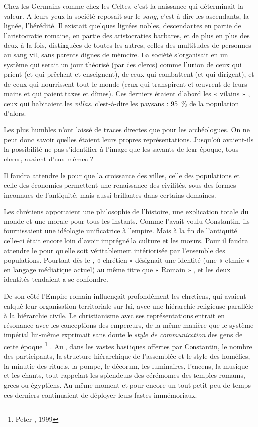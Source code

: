  Chez les Germains comme chez les Celtes, c'est la naissance qui déterminait la valeur. A leurs yeux la société reposait sur le \emph{sang}, c'est-à-dire les ascendants, la lignée, l'hérédité. Il existait quelques lignées nobles, descendantes en partie de l'aristocratie romaine, en partie des aristocraties barbares, et de plus en plus des deux à la fois, distinguées de toutes les autres, celles des multitudes de personnes au sang vil, sans parents dignes de mémoire. La société s'organisait en un système qui serait un jour théorisé (par des clercs) comme l'union de ceux qui prient (et qui prêchent et enseignent), de ceux qui combattent (et qui dirigent), et de ceux qui nourrissent tout le monde (ceux qui transpirent et œuvrent de leurs mains et qui paient taxes et dîmes). Ces derniers étaient d'abord les « vilains » , ceux qui habitaient les \emph{villas}, c'est-à-dire les paysans : 95~\% de la population d'alors.

 Les plus humbles n'ont laissé de traces directes que pour les archéologues. On ne peut donc savoir quelles étaient leurs propres représentations. Jusqu'où avaient-ils la possibilité ne pas s'identifier à l'image que les savants de leur époque, tous clercs, avaient d'eux-mêmes ?

 Il faudra attendre le  pour que la croissance des villes, celle des populations et celle des économies permettent une renaissance des civilités, sous des formes inconnues de l'antiquité, mais aussi brillantes dans certains domaines. 
 
 Les chrétiens apportaient une philosophie de l'histoire, une explication totale du monde et une morale pour tous les instants. Comme l'avait voulu Constantin, ils fournissaient une idéologie unificatrice à l'empire. Mais à la fin de l'antiquité celle-ci était encore loin d'avoir imprégné la culture et les mœurs. Pour  il faudra attendre le  pour qu'elle soit véritablement intériorisée par l'ensemble des populations. Pourtant dès le , « chrétien » désignait une identité (une « ethnie » en langage médiatique actuel) au même titre que « Romain » , et les deux identités tendaient à se confondre. 

 De son côté l'Empire romain influençait profondément les chrétiens, qui avaient calqué leur organisation territoriale sur lui, avec une hiérarchie religieuse parallèle à la hiérarchie civile. Le christianisme avec ses représentations entrait en résonance avec les conceptions des empereurs, de la même manière que le système impérial lui-même exprimait sans doute le \emph{style de communication} des gens de cette époque%
\footnote{Peter , 1999}%
. Au , dans les vastes basiliques offertes par Constantin, le nombre des participants, la structure hiérarchique de l'assemblée et le style des homélies, la minutie des rituels, la pompe, le décorum, les luminaires, l'encens, la musique et les chants, tout rappelait les splendeurs des cérémonies des temples romains, grecs ou égyptiens. Au même moment et pour encore un tout petit peu de temps ces derniers continuaient de déployer leurs fastes immémoriaux. 

